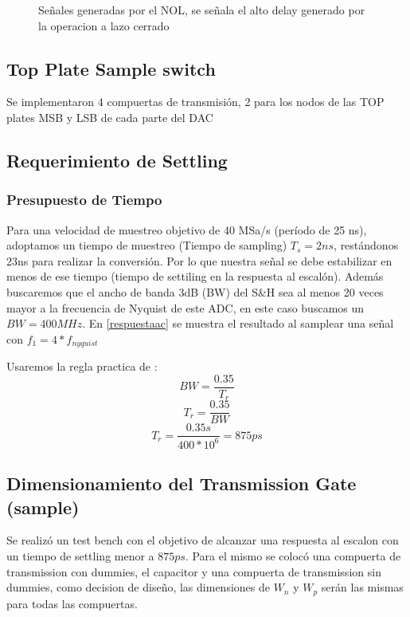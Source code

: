 \documentclass[12pt,a4paper]{report}
\begin{document}
\begin{figure}[H]
    \centering
    
    \caption{Señales generadas por el NOL, se señala el alto delay generado por la operacion a lazo cerrado}
    \label{nolsalidas2}
\end{figure}
\subsection{Top Plate Sample switch}

Se implementaron 4 compuertas de transmisión, 2 para los nodos de las TOP plates MSB y LSB de cada parte del DAC

\subsection{Requerimiento de Settling}

\subsubsection{Presupuesto de Tiempo}

Para una velocidad de muestreo objetivo de 40 MSa/s (período de 25 ns), adoptamos un tiempo de muestreo (Tiempo de sampling) $T_s=2ns$, restándonos 23ns para realizar la conversión. Por lo que nuestra señal se debe estabilizar en menos de ese tiempo (tiempo de settiling en la respuesta al escalón). Además buscaremos que el ancho de banda 3dB (BW) del S\&H sea al menos 20 veces mayor a la frecuencia de Nyquist de este ADC, en este caso buscamos un $BW = 400MHz$. En \cref{respuestaac} se muestra el resultado al samplear una señal con $f_1=4*f_{nyquist}$

Usaremos la regla practica de \cite{bwsah}:
$$BW = \frac{0.35}{T_r}$$
$$T_r = \frac{0.35}{BW}$$
$$T_r = \frac{0.35s}{400*10^6}=875ps$$



\subsection{Dimensionamiento del Transmission Gate (sample) }
Se realizó un test bench con el objetivo de alcanzar una respuesta al escalon con un tiempo de settling menor a $875ps $. Para el mismo se colocó una compuerta de transmission  con dummies, el capacitor y una compuerta de transmission sin dummies, como decision de diseño, las dimensiones de $W_n$ y $W_p$ serán las mismas para todas las compuertas.  \\
\end{document}
